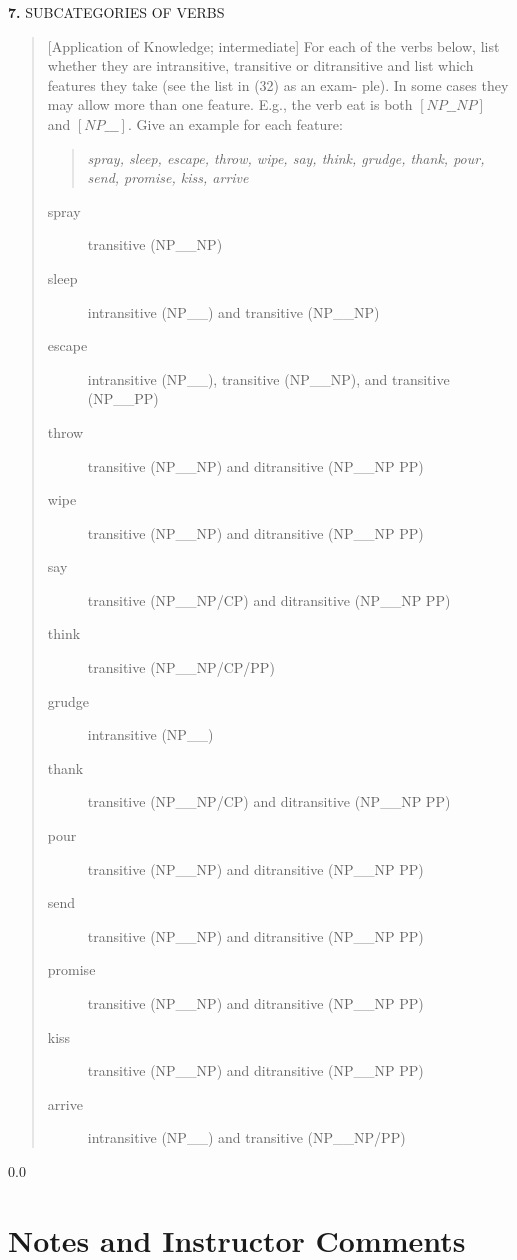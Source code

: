 \documentclass[11pt,notitlepage]{article}
\newcommand{\question}[2]{\textbf{#1.} #2}
\begin{document}
\question{7}{SUBCATEGORIES OF VERBS}
\begin{quote}
[Application of Knowledge; intermediate]
For each of the verbs below, list whether they are intransitive,
transitive or ditransitive and list which features they take (see the
list in (32) as an exam- ple). In some cases they may allow more than
one feature. E.g., the verb eat is both $\left[NP \_\_ NP\right]$ and $\left[NP \_\_\_ \right]$. Give
an example for each feature:
\begin{quote}
  \emph{spray, sleep, escape, throw, wipe, say, think, grudge, thank, pour,
    send, promise, kiss, arrive}
\end{quote}

\begin{description}
\item [spray] transitive (NP\_\_NP)
\item [sleep] intransitive (NP\_\_) and transitive (NP\_\_NP)
\item [escape] intransitive (NP\_\_), transitive (NP\_\_NP), and transitive (NP\_\_PP)
\item [throw] transitive (NP\_\_NP) and ditransitive (NP\_\_NP PP)
\item [wipe] transitive (NP\_\_NP) and ditransitive (NP\_\_NP PP)
\item [say] transitive (NP\_\_{NP/CP}) and ditransitive (NP\_\_NP PP)
\item [think] transitive (NP\_\_{NP/CP/PP}) 
\item [grudge] intransitive (NP\_\_)
\item [thank] transitive (NP\_\_{NP/CP}) and ditransitive (NP\_\_NP PP)
\item [pour] transitive (NP\_\_NP) and ditransitive (NP\_\_NP PP)
\item [send] transitive (NP\_\_NP) and ditransitive (NP\_\_NP PP)
\item [promise] transitive (NP\_\_NP) and ditransitive (NP\_\_NP PP)
\item [kiss] transitive (NP\_\_NP) and ditransitive (NP\_\_NP PP)
\item [arrive] intransitive (NP\_\_) and transitive (NP\_\_{NP/PP})
\end{description}

\end{quote}

\newpage
  {\setlength{\baselineskip}%
           {0.0\baselineskip}
  \section*{Notes and Instructor Comments}
  \hrulefill \par}
\end{document}
